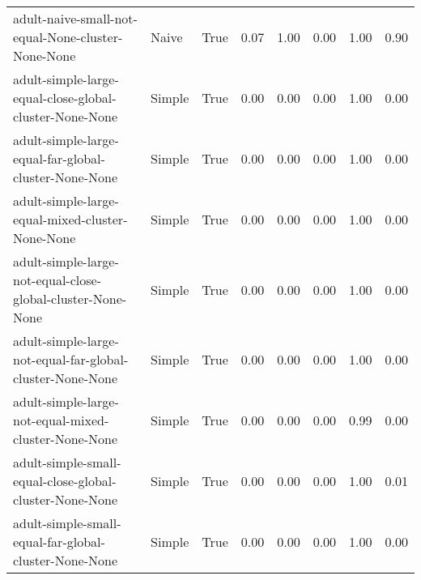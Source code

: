 \begin{longtable}{llllllll}
                                     adult-naive-small-not-equal-None-cluster-None-None &        Naive &        True &                 0.07 &                 1.00 &                         0.00 &                         1.00 &                         0.90 \\
                                adult-simple-large-equal-close-global-cluster-None-None &       Simple &        True &                 0.00 &                 0.00 &                         0.00 &                         1.00 &                         0.00 \\
                                  adult-simple-large-equal-far-global-cluster-None-None &       Simple &        True &                 0.00 &                 0.00 &                         0.00 &                         1.00 &                         0.00 \\
                                       adult-simple-large-equal-mixed-cluster-None-None &       Simple &        True &                 0.00 &                 0.00 &                         0.00 &                         1.00 &                         0.00 \\
                            adult-simple-large-not-equal-close-global-cluster-None-None &       Simple &        True &                 0.00 &                 0.00 &                         0.00 &                         1.00 &                         0.00 \\
                              adult-simple-large-not-equal-far-global-cluster-None-None &       Simple &        True &                 0.00 &                 0.00 &                         0.00 &                         1.00 &                         0.00 \\
                                   adult-simple-large-not-equal-mixed-cluster-None-None &       Simple &        True &                 0.00 &                 0.00 &                         0.00 &                         0.99 &                         0.00 \\
                                adult-simple-small-equal-close-global-cluster-None-None &       Simple &        True &                 0.00 &                 0.00 &                         0.00 &                         1.00 &                         0.01 \\
                                  adult-simple-small-equal-far-global-cluster-None-None &       Simple &        True &                 0.00 &                 0.00 &                         0.00 &                         1.00 &                         0.00 \\

\end{longtable}
